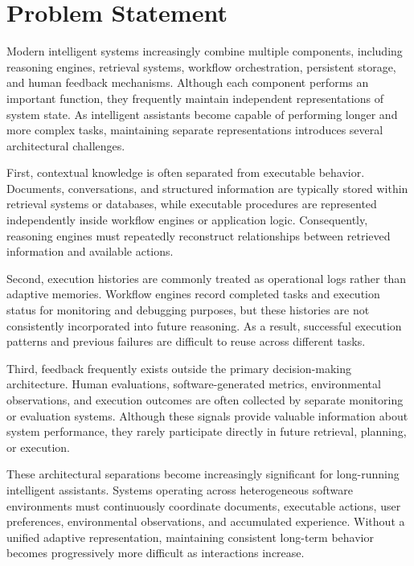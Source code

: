 \section{Problem Statement}
\label{sec:problem-statement}

Modern intelligent systems increasingly combine multiple components, including reasoning engines, retrieval systems, workflow orchestration, persistent storage, and human feedback mechanisms. Although each component performs an important function, they frequently maintain independent representations of system state. As intelligent assistants become capable of performing longer and more complex tasks, maintaining separate representations introduces several architectural challenges.

First, contextual knowledge is often separated from executable behavior. Documents, conversations, and structured information are typically stored within retrieval systems or databases, while executable procedures are represented independently inside workflow engines or application logic. Consequently, reasoning engines must repeatedly reconstruct relationships between retrieved information and available actions.

Second, execution histories are commonly treated as operational logs rather than adaptive memories. Workflow engines record completed tasks and execution status for monitoring and debugging purposes, but these histories are not consistently incorporated into future reasoning. As a result, successful execution patterns and previous failures are difficult to reuse across different tasks.

Third, feedback frequently exists outside the primary decision-making architecture. Human evaluations, software-generated metrics, environmental observations, and execution outcomes are often collected by separate monitoring or evaluation systems. Although these signals provide valuable information about system performance, they rarely participate directly in future retrieval, planning, or execution.

These architectural separations become increasingly significant for long-running intelligent assistants. Systems operating across heterogeneous software environments must continuously coordinate documents, executable actions, user preferences, environmental observations, and accumulated experience. Without a unified adaptive representation, maintaining consistent long-term behavior becomes progressively more difficult as interactions increase.

